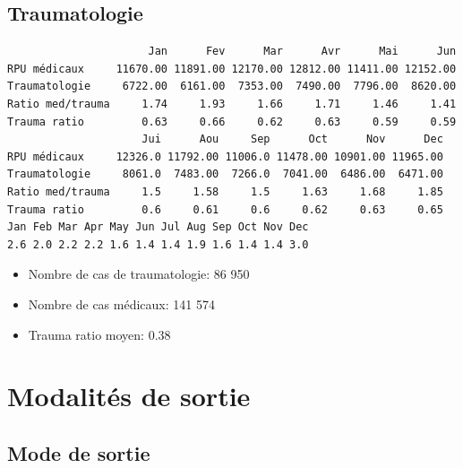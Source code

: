 \documentclass[12pt,english,french,twoside]{book}\usepackage[]{graphicx}\usepackage[]{color}
\makeatletter
\newenvironment{kframe}{%
 \def\at@end@of@kframe{}%
 \ifinner\ifhmode%
  \def\at@end@of@kframe{\end{minipage}}%
  \begin{minipage}{\columnwidth}%
 \fi\fi%
 \def\FrameCommand##1{\hskip\@totalleftmargin \hskip-\fboxsep
 \colorbox{shadecolor}{##1}\hskip-\fboxsep
     \hskip-\linewidth \hskip-\@totalleftmargin \hskip\columnwidth}%
 \MakeFramed {\advance\hsize-\width
   \@totalleftmargin\z@ \linewidth\hsize
   \@setminipage}}%
 {\par\unskip\endMakeFramed%
 \at@end@of@kframe}
\newenvironment{knitrout}{}{} %
\makeatother
\begin{document}
\section{Traumatologie}


\begin{knitrout}
\color{fgcolor}\begin{kframe}
\begin{verbatim}
                      Jan      Fev      Mar      Avr      Mai      Jun
RPU médicaux     11670.00 11891.00 12170.00 12812.00 11411.00 12152.00
Traumatologie     6722.00  6161.00  7353.00  7490.00  7796.00  8620.00
Ratio med/trauma     1.74     1.93     1.66     1.71     1.46     1.41
Trauma ratio         0.63     0.66     0.62     0.63     0.59     0.59
                     Jui      Aou     Sep      Oct      Nov      Dec
RPU médicaux     12326.0 11792.00 11006.0 11478.00 10901.00 11965.00
Traumatologie     8061.0  7483.00  7266.0  7041.00  6486.00  6471.00
Ratio med/trauma     1.5     1.58     1.5     1.63     1.68     1.85
Trauma ratio         0.6     0.61     0.6     0.62     0.63     0.65
Jan Feb Mar Apr May Jun Jul Aug Sep Oct Nov Dec 
2.6 2.0 2.2 2.2 1.6 1.4 1.4 1.9 1.6 1.4 1.4 3.0 
\end{verbatim}
\end{kframe}
\end{knitrout}

\begin{itemize}
  \item Nombre de cas de traumatologie: 86 950
  \item Nombre de cas médicaux: 141 574
  \item Trauma ratio moyen: 0.38
\end{itemize}


 

\newpage
\chapter{Modalités de sortie}


\section{Mode de sortie}
\end{document}
